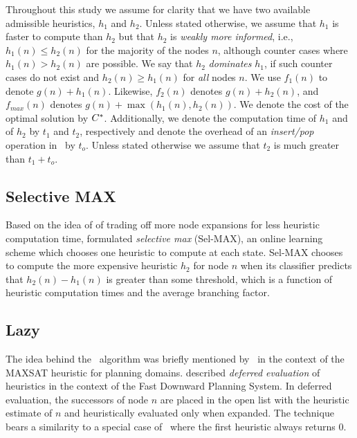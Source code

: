 Throughout this study we assume for clarity that we have two available
admissible heuristics, $h_1$ and $h_2$.
Unless stated otherwise, we assume that $h_1$ is faster to compute than $h_2$
but that $h_2$ is {\em weakly more informed}, i.e., $h_1(n) \leq h_2(n)$ for
the majority of the nodes $n$, although counter cases where $h_1(n) > h_2(n)$
are possible. We say that $h_2$ {\em dominates} $h_1$, if such counter cases do not
exist and $h_2(n) \geq h_1(n)$ for {\em all} nodes $n$.
We use $f_1(n)$ to denote $g(n)+h_1(n)$. Likewise, $f_2(n)$
denotes $g(n)+h_2(n)$, and $f_{max}(n)$ denotes $g(n) + \max(h_1(n),h_2(n))$.
We denote the cost of the optimal solution by $C^\ast$. Additionally, we
denote the computation time of $h_1$ and of $h_2$ by $t_1$ and $t_2$,
respectively and denote the overhead of an {\em insert/pop} operation in
\OPEN~by $t_o$. Unless stated otherwise we assume that $t_2$ is much greater
than $t_1 + t_o$. 

\subsection{Selective MAX}

Based on the idea of of trading off more node expansions for less
heuristic computation time, \cite{domshlak-et-al:jair-2012} formulated
{\em selective max} (Sel-MAX), an online learning scheme which chooses
one heuristic to compute at each state. Sel-MAX chooses to compute the
more expensive heuristic $h_2$ for node $n$ when its classifier
predicts that $h_2(n) - h_1(n)$ is greater than some threshold, which
is a function of heuristic computation times and the average branching
factor.

\subsection{Lazy \astar}

The idea behind the \lazyastar~algorithm was briefly mentioned
by~\cite{zhang-bacchus:aaai-2012} in the context of the MAXSAT
heuristic for planning domains. \cite{Helmert.fdps} described
\emph{deferred evaluation} of heuristics in the context of the Fast
Downward Planning System. In deferred evaluation, the successors of
node $n$ are placed in the open list with the heuristic estimate of
$n$ and heuristically evaluated only when expanded.  The technique
bears a similarity to a special case of \lazyastar~where the first
heuristic always returns 0.

